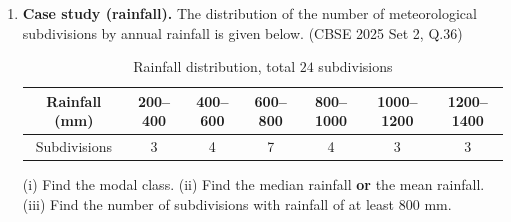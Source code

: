 \begin{enumerate}[label=\thesubsection.\arabic*, ref=\thesubsection.\theenumi]
\solution
Let $x$ and $y$ be the amounts lent at $10\%$ and $15\%$. Then
\begin{align}
	0.10x + 0.15y &= 1900 \\
	0.15x + 0.10y &= 2100
\end{align}
The augmented matrix of $\vec{A}\vec{x} = \vec{b}$ is $\myvec{\vec{A} & \vec{b}}$. Using Gaussian elimination (Gauss--Jordan row reduction),
\begin{align}
	\myvec{0.10 & 0.15 & 1900 \\ 0.15 & 0.10 & 2100}
	&\xleftrightarrow[]{R_1 \leftarrow 10R_1}
	\myvec{1 & 1.5 & 19000 \\ 0.15 & 0.10 & 2100}
	\\
	&\xleftrightarrow[]{R_2 \leftarrow R_2 - 0.15R_1}
	\myvec{1 & 1.5 & 19000 \\ 0 & -0.125 & -750}
	\\
	&\xleftrightarrow[]{R_2 \leftarrow R_2/\brak{-0.125}}
	\myvec{1 & 1.5 & 19000 \\ 0 & 1 & 6000}
	\\
	&\xleftrightarrow[]{R_1 \leftarrow R_1 - 1.5R_2}
	\myvec{1 & 0 & 10000 \\ 0 & 1 & 6000}
\end{align}
Both $\vec{A}$ and $\myvec{\vec{A} & \vec{b}}$ have two non-zero rows, so
\begin{align}
	\rank\brak{\vec{A}} = \rank\myvec{\vec{A} & \vec{b}} = 2 = \text{number of unknowns}
\end{align}
Hence the system is consistent with a unique solution,
\begin{align}
	\vec{x} = \myvec{x \\ y} = \myvec{10000 \\ 6000}
\end{align}
The amounts are  at $10\%$ and  at $15\%$. The following code verifies the solution
\begin{lstlisting}[frame=single, basicstyle=\rmfamily, escapeinside={(*@}{@*)}]
(*@\makebox[\dimexpr\linewidth-2\fboxsep-2\fboxrule\relax][c]{codes/34.c}@*)
\end{lstlisting}

\item
\textbf{Case study (rainfall).} The distribution of the number of meteorological subdivisions by annual rainfall is given below.
\hfill (CBSE 2025 Set 2, Q.36)
\begin{table}[H]
	\centering
	\begin{tabular}{|c|c|c|c|c|c|c|}
		\hline
		Rainfall (mm) & 200--400 & 400--600 & 600--800 & 800--1000 & 1000--1200 & 1200--1400 \\ \hline
		Subdivisions & 3 & 4 & 7 & 4 & 3 & 3 \\ \hline
	\end{tabular}
	\caption{Rainfall distribution, total $24$ subdivisions}
	\label{tab:CBSE25S2-q36}
\end{table}
(i) Find the modal class. (ii) Find the median rainfall \textbf{or} the mean rainfall. (iii) Find the number of subdivisions with rainfall of at least $800$ mm.


\end{enumerate}
